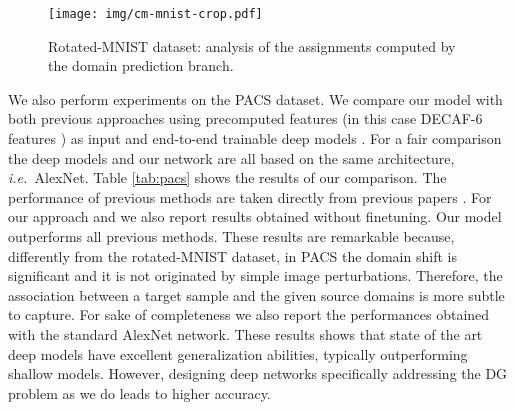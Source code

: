 \documentclass{article}
\newcommand{\ie}{\textit{i.e.~}}
\begin{document}
\begin{figure}[t]
\centering
\texttt{[image: img/cm-mnist-crop.pdf]}
    \caption{Rotated-MNIST dataset: analysis of the assignments computed by the domain prediction branch.} 
   \label{fig:cm-mnist}
   \vspace{-0.45cm}
\end{figure}


We also perform experiments on the PACS dataset. We compare our model with both previous approaches using precomputed features (in this case DECAF-6 features \cite{donahue2014decaf}) as input \cite{ghifary2015domain,xu2014exploiting,muandet2013domain} and end-to-end trainable deep models \cite{li2017deeper,li2017learning}. For a fair comparison the deep models \cite{li2017deeper,li2017learning} and our network are all based on the same architecture, \ie AlexNet.  Table \ref{tab:pacs} shows the results of our comparison. The performance of previous methods are taken directly from previous papers \cite{li2017deeper,li2017learning}. For our approach and \cite{li2017deeper} we also report results obtained without finetuning.
Our model outperforms all previous methods. These results are remarkable because, differently from the rotated-MNIST dataset, in PACS the domain shift is significant and it is not originated by simple image perturbations. Therefore, the association between a target sample and the given source domains is more subtle to capture. For sake of completeness we also report the performances obtained with the standard AlexNet network. These results shows that state of the art deep models have excellent generalization abilities, typically outperforming shallow models. However, designing deep networks specifically addressing the DG problem as we do leads to higher accuracy.
\end{document}
